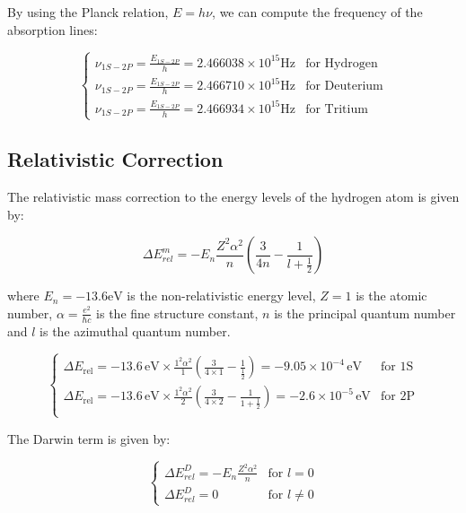 \documentclass[11pt]{article}
\begin{document}
    By using the Planck relation, $E = h\nu$, we can compute the frequency of the absorption lines:

    \begin{equation}
        \begin{cases}
            \nu_{1S-2P} = \frac{E_{1S-2P}}{h} = 2.466038 \times 10^{15} \text{Hz} & \text{for Hydrogen} \\
            \nu_{1S-2P} = \frac{E_{1S-2P}}{h} = 2.466710 \times 10^{15} \text{Hz} & \text{for Deuterium} \\
            \nu_{1S-2P} = \frac{E_{1S-2P}}{h} = 2.466934 \times 10^{15} \text{Hz} & \text{for Tritium}
        \end{cases}
    \end{equation}

    \subsection{Relativistic Correction}

    The relativistic mass correction to the energy levels of the hydrogen atom is given by:

    \begin{equation}
        \Delta E^m_{rel} = -E_n \frac{Z^2 \alpha^2}{n} (\frac{3}{4n} - \frac{1}{l + \frac{1}{2}})
    \end{equation}

    where $E_n = -13.6 \text{eV}$ is the non-relativistic energy level, $Z = 1$ is the atomic number, $\alpha = \frac{e^2}{\hbar c}$ is the fine structure constant, $n$ is the principal quantum number and $l$ is the azimuthal quantum number.

    \begin{equation}
        \begin{cases}
            \Delta E_{\text{rel}} = -13.6 \, \text{eV} \times \frac{1^2 \alpha^2}{1} \left(\frac{3}{4 \times 1} - \frac{1}{\frac{1}{2}}\right) = -9.05 \times 10^{-4} \, \text{eV} & \text{for 1S} \\
            \Delta E_{\text{rel}} = -13.6 \, \text{eV} \times \frac{1^2 \alpha^2}{2} \left(\frac{3}{4 \times 2} - \frac{1}{1 + \frac{1}{2}}\right) = -2.6 \times 10^{-5} \, \text{eV} & \text{for 2P} \\
        \end{cases}
    \end{equation}

    The Darwin term is given by:

    \begin{equation}
        \begin{cases}
            \Delta E^D_{rel} = -E_n \frac{Z^2 \alpha^2}{n} & \text{for $l = 0$} \\
            \Delta E^D_{rel} = 0 & \text{for $l \neq 0$}
        \end{cases}
    \end{equation}
\end{document}
